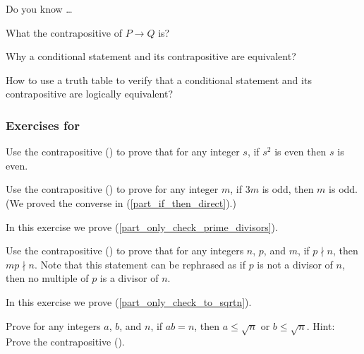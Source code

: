 \begin{exer}[\exerR] %
\label{exer_dyk_cp}
    Do you know \ldots
        \begin{exerpart}
            \item What the contrapositive of $P \to Q$ is?
            \item Why a conditional statement and its contrapositive are equivalent?
            \item How to use a truth table to verify that a conditional statement and its contrapositive are logically equivalent?
        \end{exerpart}
\end{exer}


\subsubsection*{Exercises for  \subpffcp}

\begin{exer}[\exerP] %
\label{exer_proof_sq_even_implies_even}
    Use the contrapositive () to prove that for any integer $s$, if $s^2$ is even then $s$ is even.  
\end{exer}

\begin{exer}[\exerP] %
\label{exer_proof_3m_odd}
    Use the contrapositive () to prove for any integer $m$, if $3m$ is odd, then $m$ is odd.  (We proved the converse in  (\ref{part_if_then_direct}).)
\end{exer}
    
\begin{exer}[\exerU] %
\label{exer_prove_only_check_prime_divisors}
    In this exercise we prove  (\ref{part_only_check_prime_divisors}).

     Use the contrapositive () to prove that for any integers $n$, $p$, and $m$, if $p \nmid n$, then $mp \nmid n$. Note that this statement can be rephrased as if $p$ is not a divisor of $n$, then no multiple of $p$ is a divisor of $n$.  
\end{exer}

\begin{exer}[\exerU] %
\label{exer_prove_only_check_to_sqrtn}
    In this exercise we prove  (\ref{part_only_check_to_sqrtn}).

    Prove for any integers $a$, $b$, and $n$, if $ab=n$, then $a \le \sqrt{n}$ or $b \le \sqrt{n}$.  Hint: Prove the contrapositive ().
\end{exer}

